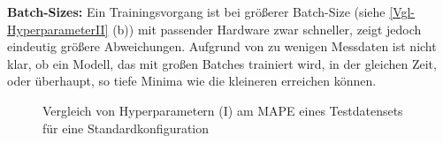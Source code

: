 \textbf{Batch-Sizes:}
Ein Trainingsvorgang ist bei größerer Batch-Size (siehe \textsf{\autoref{Vgl-HyperparameterII} (b)}) mit passender Hardware zwar schneller, zeigt jedoch eindeutig größere Abweichungen. Aufgrund von zu wenigen Messdaten ist nicht klar, ob ein Modell, das mit großen Batches trainiert wird, in der gleichen Zeit, oder überhaupt, so tiefe Minima wie die kleineren erreichen können. 
\begin{figure}[hb!]
	\centering
	\caption{Vergleich von Hyperparametern (I) am MAPE eines Testdatensets für eine Standardkonfiguration}
	\label{Vgl-HyperparameterII}
\end{figure}
